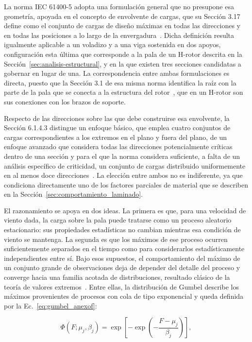 La norma IEC 61400-5 adopta una formulación general que no presupone esa geometría, apoyada en el concepto de envolvente de cargas, que su Sección 3.17 define como el conjunto de cargas de diseño máximas en todas las direcciones y en todas las posiciones a lo largo de la envergadura~\parencite*{IEC61400-5}. Dicha definición resulta igualmente aplicable a un voladizo y a una viga sostenida en dos apoyos, configuración esta última que corresponde a la pala de un H-rotor descrita en la Sección~\ref{sec:analisis-estructural}, y en la que existen tres secciones candidatas a gobernar en lugar de una. La correspondencia entre ambas formulaciones es directa, puesto que la Sección 3.1 de esa misma norma identifica la raíz con la parte de la pala que se conecta a la estructura del rotor~\parencite{IEC61400-5}, que en un H-rotor son sus conexiones con los brazos de soporte.

Respecto de las direcciones sobre las que debe construirse esa envolvente, la Sección 6.1.4.3 distingue un enfoque básico, que emplea cuatro conjuntos de cargas correspondientes a los extremos en el plano y fuera del plano, de un enfoque avanzado que considera todas las direcciones potencialmente críticas dentro de una sección y para el que la norma considera suficiente, a falta de un análisis específico de criticidad, un conjunto de cargas distribuido uniformemente en al menos doce direcciones~\parencite{IEC61400-5}. La elección entre ambos no es indiferente, ya que condiciona directamente uno de los factores parciales de material que se describen en la Sección~\ref{sec:comportamiento_laminado}.

El razonamiento se apoya en dos ideas. La primera es que, para una velocidad de viento dada, la carga sobre la pala puede tratarse como un proceso aleatorio estacionario: sus propiedades estadísticas no cambian mientras esa condición de viento se mantenga. La segunda es que los máximos de ese proceso ocurren suficientemente separados en el tiempo como para considerarlos estadísticamente independientes entre sí. Bajo esos supuestos, el comportamiento del máximo de un conjunto grande de observaciones deja de depender del detalle del proceso y converge hacia una familia acotada de distribuciones, resultado clásico de la teoría de valores extremos~\parencite{Gumbel1958}. Entre ellas, la distribución de Gumbel describe los máximos provenientes de procesos con cola de tipo exponencial y queda definida por la Ec.~\ref{eq:gumbel_anexof}:

\begin{equation}
\Phi(F; \mu_j, \beta_j) = \exp\left[ -\exp\left( -\frac{F - \mu_j}{\beta_j} \right) \right],
\label{eq:gumbel_anexof}
\end{equation}


